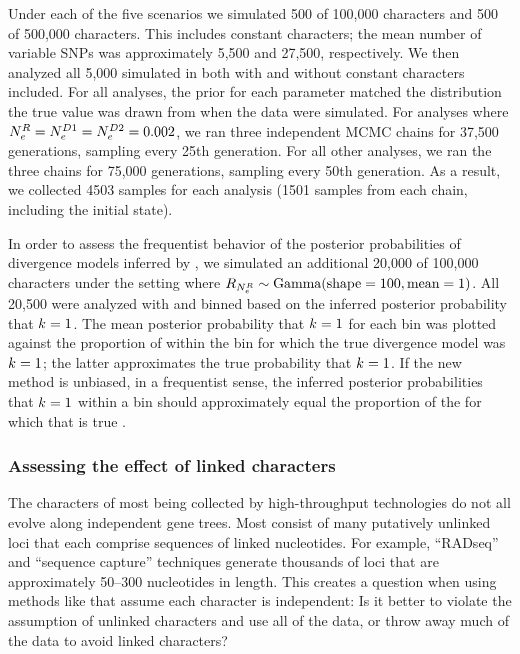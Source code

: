 Under each of the five scenarios we simulated 500 \datasets of 100,000
characters and 500 \datasets of 500,000 characters.
This includes constant characters; the mean number of variable SNPs was
approximately 5,500 and 27,500, respectively.
We then analyzed all 5,000 simulated \datasets in \ecoevolity both with and
without constant characters included.
For all analyses, the prior for each parameter matched the distribution
the true value was drawn from when the data were simulated.
For analyses where 
$\epopsize[\rootpopindex] = 
\epopsize[\descendantpopindex{1}] =
\epopsize[\descendantpopindex{2}] = 0.002$,
we ran
three independent MCMC chains for 37,500 generations, sampling every
25th generation.
For all other analyses, we ran the three chains for 75,000 generations,
sampling every 50th generation.
As a result, we collected 4503 samples for each analysis (1501 samples from
each chain, including the initial state).

In order to assess the frequentist behavior of the posterior probabilities of
divergence models inferred by \ecoevolity, we simulated an additional
20,000 \datasets of 100,000 characters under the setting where
$\rootrelativepopsize \sim \dgamma{100}{1}$.
All 20,500 \datasets were analyzed with \ecoevolity and binned based on the
inferred posterior probability that $\nevents{} = 1$.
The mean posterior probability that $\nevents{} = 1$ for each bin was plotted
against the proportion of \datasets within the bin for which the true
divergence model was $\nevents{} = 1$;
the latter approximates the true probability that $\nevents{} = 1$.
If the new method is unbiased, in a frequentist sense, the inferred posterior
probabilities that $\nevents{} = 1$ within a bin should approximately equal the
proportion of the \datasets for which that is true
\citep{Huelsenbeck2004,Oaks2012,Oaks2014dpp}.

\subsubsection{Assessing the effect of linked characters}
The characters of most \datasets being collected by high-throughput technologies
do not all evolve along independent gene trees.
Most consist of many putatively unlinked loci that each comprise sequences of
linked nucleotides.
For example, ``RADseq'' and ``sequence capture'' techniques generate thousands
of loci that are approximately 50--300 nucleotides in length.
This creates a question when using methods like \ecoevolity that assume each
character is independent:
Is it better to violate the assumption of unlinked characters and use all of
the data, or throw away much of the data to avoid linked characters?

